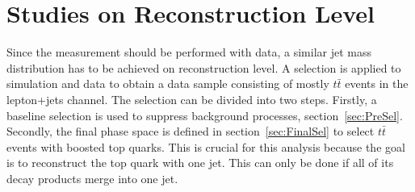 	
\section{Studies on Reconstruction Level}
\label{sec:selection}
	Since the measurement should be performed with data, a similar jet mass distribution has to be achieved on reconstruction level. A selection is applied to simulation and data to obtain a data sample consisting of mostly $t\bar{t}$ events in the lepton+jets channel. The selection can be divided into two steps. Firstly, a baseline selection is used to suppress background processes, section~\ref{sec:PreSel}. Secondly, the final phase space is defined in section~\ref{sec:FinalSel} to select $t\bar{t}$ events with boosted top quarks. This is crucial for this analysis because the goal is to reconstruct the top quark with one jet. This can only be done if all of its decay products merge into one jet.

